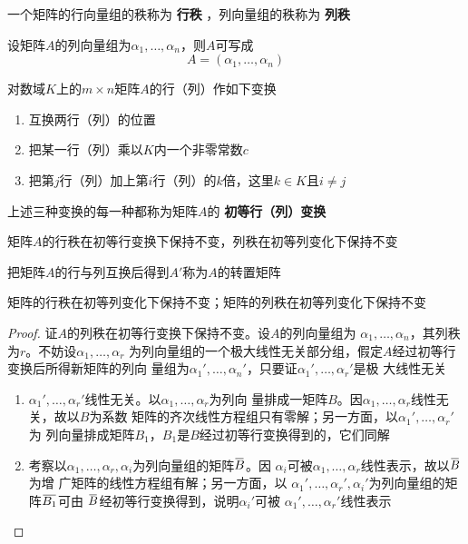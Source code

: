\documentclass[11pt]{article}
\begin{document}
\begin{definition}[]
一个矩阵的行向量组的秩称为 \textbf{行秩} ，列向量组的秩称为 \textbf{列秩}
\end{definition}

设矩阵\(A\)的列向量组为\(\alpha_1,\dots,\alpha_n\)，则\(A\)可写成
\begin{equation*}
A=(\alpha_1,\dots,\alpha_n)
\end{equation*}

\begin{definition}[]
对数域\(K\)上的\(m\times n\)矩阵\(A\)的行（列）作如下变换
\begin{enumerate}
\item 互换两行（列）的位置
\item 把某一行（列）乘以\(K\)内一个非零常数\(c\)
\item 把第\(j\)行（列）加上第\(i\)行（列）的\(k\)倍，这里\(k\in K\)且\(i\neq j\)
\end{enumerate}


上述三种变换的每一种都称为矩阵\(A\)的 \textbf{初等行（列）变换}
\end{definition}

\begin{proposition}[]
矩阵\(A\)的行秩在初等行变换下保持不变，列秩在初等列变化下保持不变
\end{proposition}

把矩阵\(A\)的行与列互换后得到\(A'\)称为\(A\)的转置矩阵

\begin{proposition}[]
矩阵的行秩在初等列变化下保持不变；矩阵的列秩在初等列变化下保持不变
\end{proposition}

\begin{proof}
证\(A\)的列秩在初等行变换下保持不变。设\(A\)的列向量组为
\(\alpha_1,\dots,\alpha_n\)，其列秩为\(r\)。不妨设\(\alpha_1,\dots,\alpha_r\)
为列向量组的一个极大线性无关部分组，假定\(A\)经过初等行变换后所得新矩阵的列向
量组为\(\alpha_1',\dots,\alpha_n'\)，只要证\(\alpha_1',\dots,\alpha_r'\)是极
大线性无关
\begin{enumerate}
\item \(\alpha_1',\dots,\alpha_r'\)线性无关。以\(\alpha_1,\dots,\alpha_r\)为列向
量排成一矩阵\(B\)。因\(\alpha_1,\dots,\alpha_r\)线性无关，故以\(B\)为系数
矩阵的齐次线性方程组只有零解；另一方面，以\(\alpha_1',\dots,\alpha_r'\)为
列向量排成矩阵\(B_1\)，\(B_1\)是\(B\)经过初等行变换得到的，它们同解
\item 考察以\(\alpha_1,\dots,\alpha_r,\alpha_i\)为列向量组的矩阵\(\bbar{B}\)。因
\(\alpha_i\)可被\(\alpha_1,\dots,\alpha_r\)线性表示，故以\(\bbar{B}\)为增
广矩阵的线性方程组有解；另一方面，以
\(\alpha_1',\dots,\alpha_r',\alpha_i'\)为列向量组的矩阵\(\bbar{B_1}\)可由
\(\bbar{B}\)经初等行变换得到，说明\(\alpha_i'\)可被
\(\alpha_1',\dots,\alpha_r'\)线性表示
\end{enumerate}
\end{proof}
\end{document}
